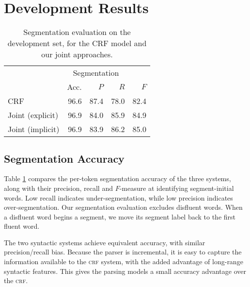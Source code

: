 \documentclass[11pt,letterpaper]{article}
\begin{document}
\section{Development Results}

\label{sec:results}

\begin{table}
    \centering
    \small
    \begin{tabular}{l|rrrr}
        \hline
               & \multicolumn{3}{c}{Segmentation} \\
               & Acc. & $P$ & $R$ & $F$ \\
        \hline
        CRF              & 96.6 & 87.4 & 78.0 & 82.4 \\
        Joint (explicit) & 96.9 & 84.0 & 85.9 & 84.9 \\
        Joint (implicit) & 96.9 & 83.9 & 86.2 & 85.0 \\
        \hline
    \end{tabular}
    \caption{\small Segmentation evaluation on the development set, for
    the CRF model and our joint approaches.\label{tab:sbd_eval}}
\end{table}

\subsection{Segmentation Accuracy}

Table \ref{tab:sbd_eval} compares the per-token segmentation accuracy of the
three systems, along with their precision, recall and $F$-measure at identifying
segment-initial words.  Low recall indicates under-segmentation, while low precision
indicates over-segmentation.  Our segmentation evaluation excludes disfluent words.
When a disfluent word begins a segment, we move its segment label back to the first
fluent word.


The two syntactic systems achieve equivalent accuracy, with similar precision/recall
bias.  Because the parser is incremental, it is easy to capture the information
available to the \textsc{crf} system, with the added advantage of long-range
syntactic features.  This gives the parsing models a small accuracy advantage
over the \textsc{crf}.
\end{document}
